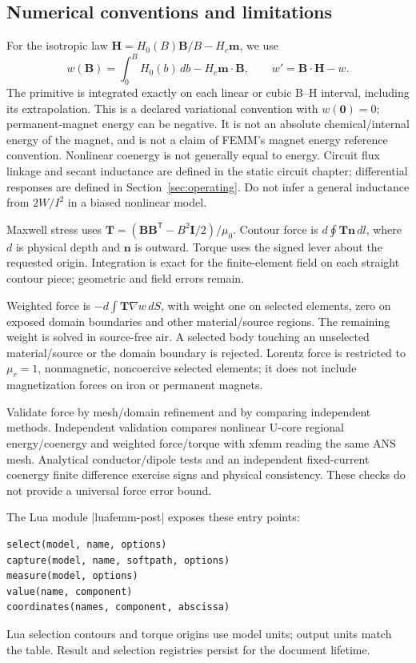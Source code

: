 \subsection{Numerical conventions and limitations}
For the isotropic law $\mathbf H=H_0(B)\mathbf B/B-H_c\mathbf m$, we use
\[
 w(\mathbf B)=\int_0^B H_0(b)\,db-H_c\mathbf m\cdot\mathbf B,
 \qquad w'=\mathbf B\cdot\mathbf H-w.
\]
The primitive is integrated exactly on each linear or cubic B--H interval,
including its extrapolation. This is a declared variational convention with
$w(\mathbf0)=0$; permanent-magnet energy can be negative. It is not an absolute
chemical/internal energy of the magnet, and is not a claim of FEMM's magnet
energy reference convention. Nonlinear coenergy is not generally equal to
energy. Circuit flux linkage and secant inductance are defined in the static
circuit chapter; differential responses are defined in Section~\ref{sec:operating}.
Do not infer a general inductance from $2W/I^2$ in a biased nonlinear model.

Maxwell stress uses $\mathbf T=(\mathbf B\mathbf B^{\mathsf T}
-B^2\mathbf I/2)/\mu_0$. Contour force is $d\oint\mathbf T\mathbf n\,dl$,
where $d$ is physical depth and $\mathbf n$ is outward. Torque uses the signed
lever about the requested origin. Integration is exact for the finite-element
field on each straight contour piece; geometric and field errors remain.

Weighted force is $-d\int\mathbf T\nabla w\,dS$, with weight one on selected
elements, zero on exposed domain boundaries and other material/source regions.
The remaining weight is solved in source-free air. A selected body touching an
unselected material/source or the domain boundary is rejected. Lorentz force
is restricted to $\mu_r=1$, nonmagnetic, noncoercive selected elements; it does
not include magnetization forces on iron or permanent magnets.

Validate force by mesh/domain refinement and by comparing independent methods.
Independent validation compares nonlinear U-core regional
energy/coenergy and weighted force/torque with xfemm reading the same ANS mesh.
Analytical conductor/dipole tests and an independent fixed-current coenergy
finite difference exercise signs and physical consistency. These checks do not
provide a universal force error bound.

The Lua module |luafemm-post| exposes these entry points:
\begin{verbatim}
select(model, name, options)
capture(model, name, softpath, options)
measure(model, options)
value(name, component)
coordinates(names, component, abscissa)
\end{verbatim}
Lua selection contours and torque origins use model units; output units match
the table. Result and selection registries persist for the document lifetime.

